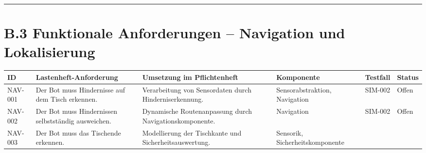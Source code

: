 \documentclass[
  a4paper,
  12pt,
  DIV=12,        %
  parskip=half,  %
  headings=small %
]{scrartcl}
\theoremstyle{definition}
\theoremstyle{definition}
\begin{document}
\begin{center}\rule{0.5\linewidth}{0.5pt}\end{center}

\section{B.3 Funktionale Anforderungen -- Navigation und
Lokalisierung}\label{b.3-funktionale-anforderungen-navigation-und-lokalisierung}

\begin{longtable}[]{@{}
  >{\raggedright\arraybackslash}p{}
  >{\raggedright\arraybackslash}p{}
  >{\raggedright\arraybackslash}p{}
  >{\raggedright\arraybackslash}p{}
  >{\raggedright\arraybackslash}p{}
  >{\raggedright\arraybackslash}p{}@{}}
\toprule\noalign{}
\begin{minipage}[b]{\linewidth}\raggedright
ID
\end{minipage} & \begin{minipage}[b]{\linewidth}\raggedright
Lastenheft-Anforderung
\end{minipage} & \begin{minipage}[b]{\linewidth}\raggedright
Umsetzung im Pflichtenheft
\end{minipage} & \begin{minipage}[b]{\linewidth}\raggedright
Komponente
\end{minipage} & \begin{minipage}[b]{\linewidth}\raggedright
Testfall
\end{minipage} & \begin{minipage}[b]{\linewidth}\raggedright
Status
\end{minipage} \\
\midrule\noalign{}
\endhead
\bottomrule\noalign{}
\endlastfoot
NAV-001 & Der Bot muss Hindernisse auf dem Tisch erkennen. &
Verarbeitung von Sensordaten durch Hinderniserkennung. &
Sensorabstraktion, Navigation & SIM-002 & Offen \\
NAV-002 & Der Bot muss Hindernissen selbstständig ausweichen. &
Dynamische Routenanpassung durch Navigationskomponente. & Navigation &
SIM-002 & Offen \\
NAV-003 & Der Bot muss das Tischende erkennen. & Modellierung der
Tischkante und Sicherheitsauswertung. & Sensorik, Sicherheitskomponente

\end{longtable}
\end{document}
